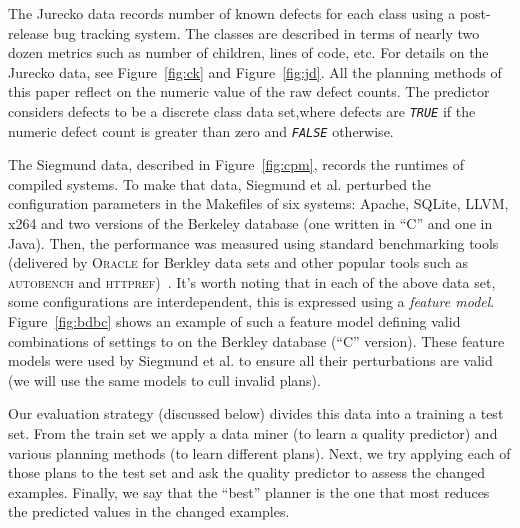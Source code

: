 \documentclass{sig-alternate}
\newcommand{\fig}[1]{Figure~\ref{fig:#1}}
\begin{document}
  
   The Jurecko data records number of known defects for each class using a post-release bug tracking system. The classes are described in terms of
  nearly two dozen metrics such as number of children, lines of code, etc. For details on the Jurecko data, see  \fig{ck} and \fig{jd}. 
 All the planning methods of this paper reflect on the numeric value of the raw defect counts. The predictor considers defects to be a discrete class data set,where defects are \textit{\texttt{TRUE}} if the numeric defect count is greater than zero and \textit{\texttt{FALSE}} otherwise.

  The Siegmund data, described in \fig{cpm},  records  the runtimes of compiled systems. To make that data, Siegmund et al. perturbed
  the configuration parameters in the Makefiles of six systems: Apache, SQLite, LLVM, x264 and two versions of the
  Berkeley database (one written in ``C'' and one in Java). Then, the performance was measured using standard benchmarking tools (delivered by \textsc{Oracle} for Berkley data sets and other popular tools such as \textsc{autobench} and \textsc{httpref})~\cite{sven12}. It's worth noting that in each of the above data set, some configurations are interdependent, this is expressed using a \textit{feature model}.
   \fig{bdbc} shows an example of such a feature model defining valid combinations of settings to on the Berkley database (``C'' version). These feature models were used by Siegmund et al. to ensure all their perturbations are valid
   (we will use the same models to cull invalid plans).
  


  Our evaluation strategy (discussed below) divides this data into a training a test set.
  From the train set we apply a data miner (to learn a quality predictor) and
  various planning methods (to learn different plans). Next, we try applying
  each of those plans to the  test set and ask the quality predictor to assess the changed examples.
  Finally, we say that the  ``best'' planner is the one that most reduces the predicted values
  in the changed examples.
  
\end{document}
